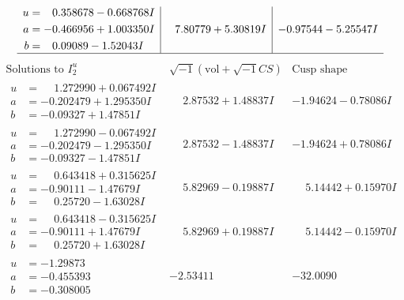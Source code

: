 \documentclass[1p]{elsarticle_modified}
\theoremstyle{definition}
\newcommand{\I}{\sqrt{-1}}
\begin{document}
$$\begin{array}{c|c|c}
\begin{aligned}
u &= \phantom{-}0.358678 - 0.668768 I \\
a &= -0.466956 + 1.003350 I \\
b &= \phantom{-}0.09089 - 1.52043 I\end{aligned}
 & \phantom{-}7.80779 + 5.30819 I & -0.97544 - 5.25547 I\\
 \hline 
 \end{array}$$\newpage$$\begin{array}{c|c|c}  
\text{Solutions to }I^u_{2}& \I (\text{vol} + \sqrt{-1}CS) & \text{Cusp shape}\\
 \hline 
\begin{aligned}
u &= \phantom{-}1.272990 + 0.067492 I \\
a &= -0.202479 + 1.295350 I \\
b &= -0.09327 + 1.47851 I\end{aligned}
 & \phantom{-}2.87532 + 1.48837 I & -1.94624 - 0.78086 I \\ \hline\begin{aligned}
u &= \phantom{-}1.272990 - 0.067492 I \\
a &= -0.202479 - 1.295350 I \\
b &= -0.09327 - 1.47851 I\end{aligned}
 & \phantom{-}2.87532 - 1.48837 I & -1.94624 + 0.78086 I \\ \hline\begin{aligned}
u &= \phantom{-}0.643418 + 0.315625 I \\
a &= -0.90111 - 1.47679 I \\
b &= \phantom{-}0.25720 - 1.63028 I\end{aligned}
 & \phantom{-}5.82969 - 0.19887 I & \phantom{-}5.14442 + 0.15970 I \\ \hline\begin{aligned}
u &= \phantom{-}0.643418 - 0.315625 I \\
a &= -0.90111 + 1.47679 I \\
b &= \phantom{-}0.25720 + 1.63028 I\end{aligned}
 & \phantom{-}5.82969 + 0.19887 I & \phantom{-}5.14442 - 0.15970 I \\ \hline\begin{aligned}
u &= -1.29873\phantom{ +0.000000I} \\
a &= -0.455393\phantom{ +0.000000I} \\
b &= -0.308005\phantom{ +0.000000I}\end{aligned}
 & -2.53411\phantom{ +0.000000I} & -32.0090\phantom{ +0.000000I} \\ \hline\begin{aligned}

\end{aligned}
\end{array}$$
\end{document}
